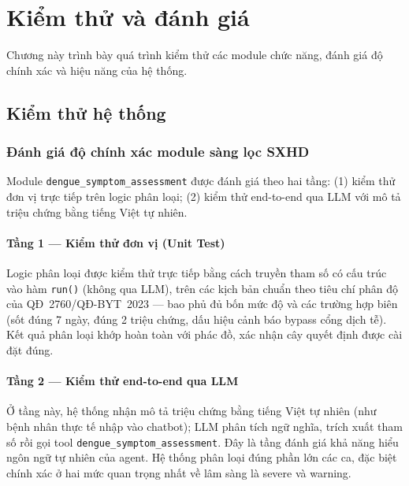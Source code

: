 \documentclass[a4paper,13pt,3p,twoside,openany]{report}
\theoremstyle{definition}
\theoremstyle{remark}
\theoremstyle{definition}
\let\ORIGsection\section
\let\ORIGsubsection\subsection
\renewcommand{\section}{\needspace{3\baselineskip}\ORIGsection}
\renewcommand{\subsection}{\needspace{3\baselineskip}\ORIGsubsection}
\begin{document}
\chapter{Kiểm thử và đánh giá}

Chương này trình bày quá trình kiểm thử các module chức năng, đánh giá độ chính xác và hiệu năng của hệ thống.

\section{Kiểm thử hệ thống}

\subsection{Đánh giá độ chính xác module sàng lọc SXHD}

Module \texttt{dengue\_symptom\_assessment} được đánh giá theo hai tầng: (1) kiểm thử đơn vị trực tiếp trên logic phân loại; (2) kiểm thử end-to-end qua LLM với mô tả triệu chứng bằng tiếng Việt tự nhiên.

\subsubsection{Tầng 1 — Kiểm thử đơn vị (Unit Test)}

Logic phân loại được kiểm thử trực tiếp bằng cách truyền tham số có cấu trúc vào hàm \texttt{run()} (không qua LLM), trên các kịch bản chuẩn theo tiêu chí phân độ của QĐ~2760/QĐ-BYT~2023 --- bao phủ đủ bốn mức độ và các trường hợp biên (sốt đúng 7 ngày, đúng 2 triệu chứng, dấu hiệu cảnh báo bypass cổng dịch tễ). Kết quả phân loại khớp hoàn toàn với phác đồ, xác nhận cây quyết định được cài đặt đúng.

\subsubsection{Tầng 2 — Kiểm thử end-to-end qua LLM}

Ở tầng này, hệ thống nhận mô tả triệu chứng bằng tiếng Việt tự nhiên (như bệnh nhân thực tế nhập vào chatbot); LLM phân tích ngữ nghĩa, trích xuất tham số rồi gọi tool \texttt{dengue\_symptom\_assessment}. Đây là tầng đánh giá khả năng hiểu ngôn ngữ tự nhiên của agent. Hệ thống phân loại đúng phần lớn các ca, đặc biệt chính xác ở hai mức quan trọng nhất về lâm sàng là severe và warning.
\end{document}
